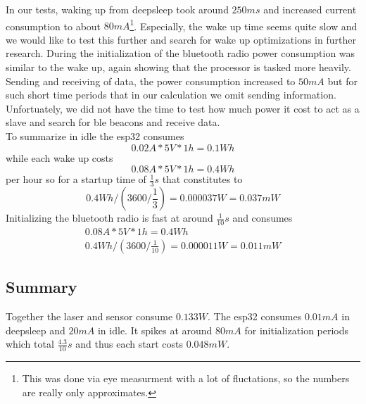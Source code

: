 In our tests, waking up from deepsleep took around $250ms$ and increased current consumption to about $80mA$\footnote{This was done via eye measurment with a lot of fluctations, so the numbers are really only approximates.}. Especially, the wake up time seems quite slow and we would like to test this further and search for wake up optimizations in further research.
During the initialization of the bluetooth radio power consumption was similar to the wake up, again showing that the processor is tasked more heavily. Sending and receiving of data, the power consumption increased to $50mA$ but for such short time periods that in our calculation we omit sending information. Unfortuately, we did not have the time to test how much power it cost to act as a slave and search for ble beacons and receive data.\\


To summarize in idle the esp32 consumes
\begin{equation*}
    0.02A * 5V *1h= 0.1Wh
\end{equation*}
while each wake up costs
\begin{equation*}
    0.08A * 5V *1h= 0.4Wh
\end{equation*}
per hour so for a startup time of $\frac{1}{3}s$  that constitutes to 
\begin{equation*}
    0.4Wh / (3600 / \frac{1}{3}) = 0.000037W = 0.037mW
\end{equation*}
Initializing the bluetooth radio is fast at around $\frac{1}{10}s$ and consumes 
\begin{gather*}
        0.08A * 5V * 1h = 0.4Wh \\
        0.4Wh / (3600 / \frac{1}{10}) = 0.000011W = 0.011mW 
\end{gather*}

\subsection{Summary}
Together the laser and sensor consume $0.133W$. The esp32 consumes $0.01mA$ in deepsleep and $20mA$ in idle. It spikes at around $80mA$ for initialization periods which total $\frac{4.3}{10}s$ and thus each start costs $0.048mW$.
